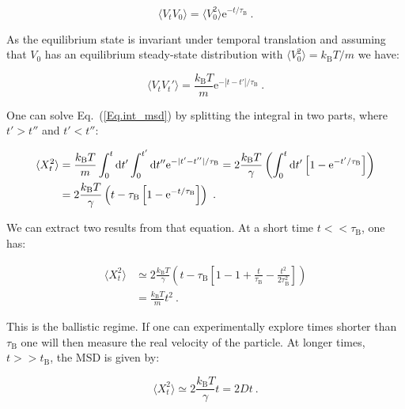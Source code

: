 \begin{equation}
	\langle V_t V_0 \rangle = \langle V_0 ^2 \rangle \mathrm{e}^{-t/\tau_{\mathrm{B}}}~.
\end{equation}

As the equilibrium state is invariant under temporal translation and assuming that $V_0$ has an equilibrium steady-state distribution with $\langle V_0^2 \rangle = k_\mathrm{B} T / m$ we have:

\begin{equation}
	\langle V_t V_t' \rangle = \frac{k_\mathrm{B}T}{m} \mathrm{e}^{-|t-t'|/\tau_{\mathrm{B}}}~.
\end{equation}

One can solve Eq.~(\ref{Eq.int_msd}) by splitting the integral in two parts, where $t'>t''$ and $ t' < t''$:

\begin{equation}
	\begin{aligned}
		\langle X_t ^2 \rangle & =    \frac{k_\mathrm{B}T}{m}  \int _0 ^t \textnormal{d}t' \int _0 ^{t'} \textnormal{d}t'' \mathrm{e} ^ {- |t' - t''| / \tau_\mathrm{B}} = 2 \frac{k_\mathrm{B}T}{\gamma} \left( \int_0 ^t \textnormal{d}t' \left[1 - \mathrm{e}^{-t'/\tau_\mathrm{B}} \right] \right) \\
		& = 2 \frac{k_\mathrm{B} T}{\gamma} \left( t - \tau_\mathrm{B} \left[ 1 - \mathrm{e}^{-t/\tau_\mathrm{B}} \right] \right) ~.
	\end{aligned}
\end{equation}

We can extract two results from that equation. At a short time $t << \tau_\mathrm{B}$, one has:

\begin{equation}
	\begin{aligned}
		\langle X_t ^2 \rangle & \simeq  2 \frac{k_\mathrm{B} T}{\gamma} \left( t - \tau_\mathrm{B} \left[ 1 - 1 + \frac{t}{\tau_\mathrm{B}} - \frac{t^2}{ 2 \tau_\mathrm{B} ^2}\right]         \right) \\
		& = \frac{k_\mathrm{B} T}{m} t^2 ~.
	\end{aligned}
	\label{Eq.shorttimemsd}
\end{equation}

This is the ballistic regime. If one can experimentally explore times shorter than $\tau _ \mathrm{B} $ one will then measure the real velocity of the particle. At longer times, $t >> t_\mathrm{B}$, the \gls{MSD} is given by:

\begin{equation}
	\langle X_t ^2 \rangle \simeq 2 \frac{k_\mathrm{B}T}{\gamma} t = 2Dt ~.
	\label{eq:longtimemsd}
\end{equation}

